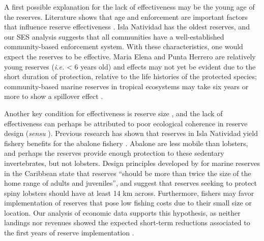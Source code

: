 \documentclass{frontiersSCNS}
\begin{document}
A first possible explanation for the lack of effectiveness may be the
young age of the reserves. Literature shows that age and enforcement are
important factors that influence reserve effectiveness
\citep{edgar_2014-UO,babcock_2010}. Isla Natividad has the oldest
reserves, and our SES analysis suggests that all communities have a
well-established community-based enforcement system. With these
characteristics, one would expect the reserves to be effective. Maria
Elena and Punta Herrero are relatively young reserves (\emph{i.e.}
\textless{} 6 years old) and effects may not yet be evident due to the
short duration of protection, relative to the life histories of the
protected species; community-based marine reserves in tropical
ecosystems may take six years or more to show a spillover effect
\citep{dasilva_2015-zX}.

Another key condition for effectiveness is reserve size
\citep{edgar_2014-UO}, and the lack of effectiveness can perhaps be
attributed to poor ecological coherence in reserve design (\emph{sensu}
\citet{rees_2018}). Previous research has shown that reserves in Isla
Natividad yield fishery benefits for the abalone fishery
\citep{rossetto_2015-V0}. Abalone are less mobile than lobsters, and
perhaps the reserves provide enough protection to these sedentary
invertebrates, but not lobsters. Design principles developed by
\citet{green_2017} for marine reserves in the Caribbean state that
reserves ``should be more than twice the size of the home range of
adults and juveniles'', and suggest that reserves seeking to protect
spiny lobsters should have at least 14 km across. Furthermore, fishers
may favor implementation of reserves that pose low fishing costs due to
their small size or location. Our analysis of economic data supports
this hypothesis, as neither landings nor revenues showed the expected
short-term reductions associated to the first years of reserve
implementation \citep{ovando_2016-Wg}.
\end{document}
